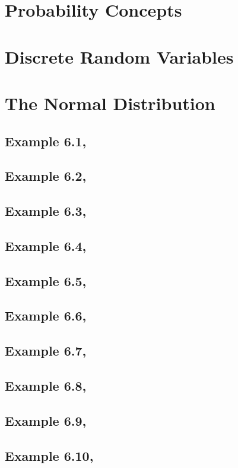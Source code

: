 \documentclass{article}\usepackage[]{graphicx}\usepackage[]{color}
\begin{document}
\section{Probability Concepts}


\section{Discrete Random Variables}


\section{The Normal Distribution}

\subsection{Example 6.1,}
\subsection{Example 6.2,}
\subsection{Example 6.3,}
\subsection{Example 6.4,}
\subsection{Example 6.5,}
\subsection{Example 6.6,}
\subsection{Example 6.7,}
\subsection{Example 6.8,}
\subsection{Example 6.9,}
\subsection{Example 6.10,}
\end{document}
